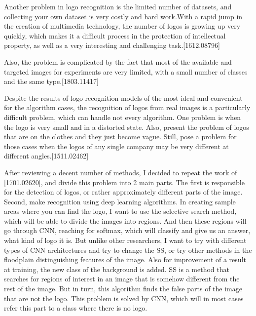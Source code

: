 \par Another problem in logo recognition is the limited number of datasets, and collecting your own dataset is very costly and hard work.With a rapid jump in the creation of multimedia technology, the number of logos is growing up very quickly, which makes it a difficult process in the protection of intellectual property, as well as a very interesting and challenging task.[1612.08796] 

\par Also, the problem is complicated by the fact that most of the available and targeted images for experiments are very limited, with a small number of classes and the same type.[1803.11417] 

\par Despite the results of logo recognition models of the most ideal and convenient for the algorithm cases, the recognition of logos from real images is a particularly difficult problem, which can handle not every algorithm. One problem is when the logo is very small and in a distorted state. Also, present the problem of logos that are on the clothes and they just become vague. Still, pose a problem for those cases when the logos of any single company may be very different at different angles.[1511.02462]

\par After reviewing a decent number of methods, I decided to repeat the work of [1701.02620], and divide this problem into 2 main parts. The first is responsible for the detection of logos, or rather approximately different parts of the image. Second, make recognition using deep learning algorithms. In creating sample areas where you can find the logo, I want to use the selective search method, which will be able to divide the images into regions. And then these regions will go through CNN, reaching for softmax, which will classify and give us an answer, what kind of logo it is. But unlike other researchers, I want to try with different types of CNN architectures and try to change the SS, or try other methods in the floodplain distinguishing features of the image. Also for improvement of a result at training, the new class of the background is added. SS is a method that searches for regions of interest in an image that is somehow different from the rest of the image. But in turn, this algorithm finds the false parts of the image that are not the logo. This problem is solved by CNN, which will in most cases refer this part to a class where there is no logo.


